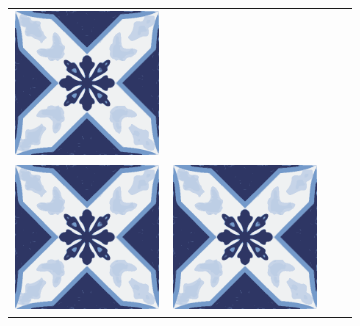 \documentclass{oci}
\begin{document}
\begin{problemDescription}
\begin{figure}[h]
\begin{subfigure}{0.45\textwidth}
\begin{center}
{\begin{tabular}{cccc}
        \includegraphics[scale=0.3]{b.eps} \\
        \includegraphics[scale=0.3]{b.eps} &
        \includegraphics[scale=0.3]{b.eps} &

\end{tabular}}
\end{center}
\end{subfigure}
\end{figure}
\end{problemDescription}
\end{document}
